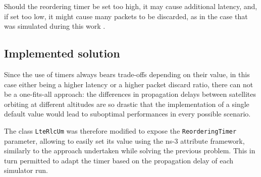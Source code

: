 Should the reordering timer be set too high, it may cause additional latency, and, if set too low, it might cause many packets to be discarded, as in the case that was simulated during this work \cite{efficient-reassembly-pdcp}.


\subsection{Implemented solution}
Since the use of timers always bears trade-offs depending on their value, in this case either being a higher latency or a higher packet discard ratio, there can not be a one-fits-all approach: the differences in propagation delays between satellites orbiting at different altitudes are so drastic that the implementation of a single default value would lead to suboptimal performances in every possible scenario. 

The class \texttt{LteRlcUm} was therefore modified to expose the \texttt{ReorderingTimer} parameter, allowing to easily set its value using the ns-3 attribute framework, similarly to the approach undertaken while solving the previous problem. This in turn permitted to adapt the timer based on the propagation delay of each simulator run.